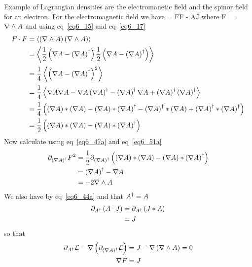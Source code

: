 Example of Lagrangian densities are the electromanetic field and the spinor field for an electron.  For the electromagnetic field we have
\be
	 = \half F\cdot F - A\cdot J
\ee
where F = $\nabla\wedge A$ and using eq~\ref{eq6_15} and eq~\ref{eq6_17}
\begin{align}
		F\cdot F &= \left < {\left ( {\nabla \wedge A} \right )\left ( {\nabla \wedge A} \right )} \right >_{} \nonumber \\
		         &= \left < {\displaystyle\frac{1}{2}\left ( {\nabla A - \left ( {\nabla A } \right )^{\dagger}} \right )\displaystyle\frac{1}{2}\left ( {\nabla A - \left ( {\nabla A } \right )^{\dagger}} \right )} \right >_{} 
		            \nonumber \\
				 &= \displaystyle\frac{1}{4}\left < {\left ( {\nabla A - \left ( {\nabla A} \right )^{\dagger}} \right )^{2}} \right >_{} \nonumber \\
		         &= \displaystyle\frac{1}{4}\left < {\nabla A\nabla A-\nabla A\left ( {\nabla A} \right )^{\dagger}
		            -\left ( {\nabla A} \right )^{\dagger}\nabla A + \left ( {\nabla A} \right )^{\dagger}\left ( {\nabla A} \right )^{\dagger}} \right >_{} \nonumber \\
		         &= \displaystyle\frac{1}{4}\left ( {\left ( {\nabla A} \right )*\left ( {\nabla A} \right ) - \left ( {\nabla A} \right )*\left ( {\nabla A} \right )^{\dagger}
		           -\left ( {\nabla A} \right )^{\dagger}*\left ( {\nabla A} \right )+ \left ( {\nabla A} \right )^{\dagger}*\left ( {\nabla A} \right )^{\dagger}} \right ) \nonumber \\
		         &= \displaystyle\frac{1}{2}\left ( {\left ( {\nabla A} \right )*\left ( {\nabla A} \right ) - \left ( {\nabla A} \right )*\left ( {\nabla A} \right )^{\dagger}} \right )
\end{align}
Now calculate using eq~\ref{eq6_47a} and eq~\ref{eq6_51a}
\begin{align}
	\partial_{\left ( {\nabla A} \right )^{\dagger}} F^{2} &= \displaystyle\frac{1}{2}\partial_{\left ( {\nabla A} \right )^{\dagger}}
	                                          \left ( {\left ( {\nabla A} \right )*\left ( {\nabla A} \right ) - \left ( {\nabla A} \right )*\left ( {\nabla A} \right )^{\dagger}} \right )
	                                          \nonumber \\
	                                       &= \left ( {\nabla A} \right )^{\dagger} - \nabla A \nonumber \\
	                                       &= -2\nabla \wedge A
\end{align}
We also have by eq~\ref{eq6_44a} and that $A^{\dagger} = A$
\begin{align}
	\partial_{A^{\dagger}}\left ( {A\cdot J} \right ) &= \partial_{A^{\dagger}}\left ( {J * A} \right ) \nonumber \\
	                                  &= J
\end{align}
so that
\begin{align}
	\partial_{A^{\dagger}}\mathcal{L}-\nabla\left ( {\partial_{\left ( {\nabla A} \right )^{\dagger}}\mathcal{L}} \right ) &= 
		J - \nabla\left ( {\nabla \wedge A} \right ) = 0 \\
		\nabla F &= J
\end{align}




